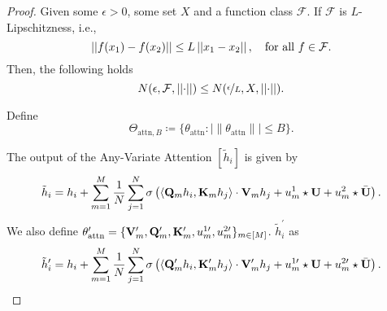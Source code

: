 \begin{proof}
    Given some $\epsilon > 0$, some set $X$ and a function class $\mathcal{F}$.
    If $\mathcal{F}$ is $L$-Lipschitzness, i.e., 
    \begin{equation*}
        \left\lvert \left\lvert f(x_1) - f(x_2)\right\rvert \right\rvert \leq
        L \left\lvert \left\lvert x_1 - x_2\right\rvert \right\rvert, \quad \text{for all }f \in \mathcal{F}.
    \end{equation*}
    Then, the following holds
    \begin{equation*}
        N(\epsilon, \mathcal{F}, \left\lvert \left\lvert\cdot\right\rvert \right\rvert)
        \leq
        N( \nicefrac{\epsilon}{L}, X, \left\lvert \left\lvert\cdot\right\rvert \right\rvert ).
    \end{equation*}

    Define 
    \begin{equation*}
        \Theta_{\text{attn}, B}
        \coloneqq
        \{ \theta_{\text{attn}}:  \lvert \lVert \theta_{\text{attn}} \rVert \rvert  \leq B \}.
    \end{equation*}

    The output of the Any-Variate Attention $[\tilde{h}_i]$ is given by
    \begin{equation*}
        \tilde{h}_i
        =
        h_i
        +
        \sum_{m=1}^M
        \frac{1}{N}
        \sum_{j=1}^N
        \sigma
        \left(
        \Braket{ \mathbf{Q}_m h_i, \mathbf{K}_m h_j }
        \cdot \mathbf{V}_m h_j
        +
        u_m^1
        \star 
        \mathbf{U}
        +
        u_m^2
        \star
        \bar{\mathbf{U}}
        \right).
    \end{equation*}
    We also define $\theta^\prime_{\text{attn}} = \{ \mathbf{V}_m^\prime, \mathbf{Q}_m^\prime, \mathbf{K}_m^\prime, u_m^{1\prime}, u_m^{2 \prime} \}_{m \in [M]}$.
    $\tilde{h}^\prime_i$ as
    \begin{equation*}
        \tilde{h}_i^\prime
        =
        h_i
        +
        \sum_{m=1}^M
        \frac{1}{N}
        \sum_{j=1}^N
        \sigma
        \left(
        \Braket{ \mathbf{Q}_m^\prime h_i, \mathbf{K}_m^\prime h_j }
        \cdot \mathbf{V}_m^\prime h_j
        +
        u_m^{1\prime}
        \star 
        \mathbf{U}
        +
        u_m^{2 \prime}
        \star
        \bar{\mathbf{U}}
        \right).
    \end{equation*}


\end{proof}
